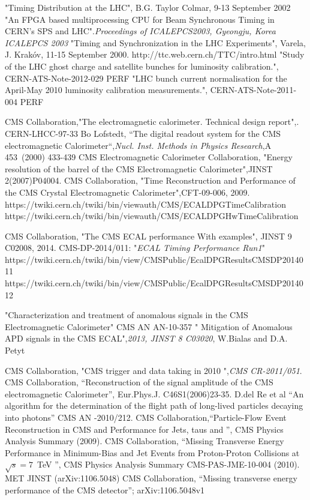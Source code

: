 \begin{thebibliography}{9}
 "Timing Distribution at the LHC",  B.G. Taylor Colmar, 9-13 September 2002
 "An FPGA based multiprocessing CPU for Beam
Synchronous Timing in CERN’s SPS and LHC".\emph{Proceedings of ICALEPCS2003, Gyeongju, Korea
ICALEPCS 2003}
 "Timing and Synchronization in the LHC Experiments", Varela, J. Krakóv, 11-15 September 2000.
 http://ttc.web.cern.ch/TTC/intro.html
 "Study of the LHC ghost charge and
satellite bunches for luminosity calibration.", CERN-ATS-Note-2012-029 PERF
 "LHC bunch current normalisation for the April-May 2010 luminosity calibration measurements.", CERN-ATS-Note-2011-004 PERF

CMS Collaboration,"The electromagnetic calorimeter. Technical design report",. CERN-LHCC-97-33
 Bo Lofstedt, ``The digital readout system for the CMS electromagnetic Calorimeter``,\textit{Nucl. Inst.  Methods in Physics Research},A 453~(2000) 433-439
CMS Electromagnetic Calorimeter Collaboration, "Energy resolution of the barrel of the CMS Electromagnetic Calorimeter",JINST 2(2007)P04004.
CMS Collaboration, "Time Reconstruction and Performance of the CMS Crystal Electromagnetic Calorimeter",CFT-09-006, 2009.
 https://twiki.cern.ch/twiki/bin/viewauth/CMS/ECALDPGTimeCalibration
https://twiki.cern.ch/twiki/bin/viewauth/CMS/ECALDPGHwTimeCalibration

CMS Collaboration, "The CMS ECAL performance With examples", JINST 9 C02008, 2014.
 CMS-DP-2014/011: "\textit{ECAL Timing Performance Run1}"
 https://twiki.cern.ch/twiki/bin/view/CMSPublic/EcalDPGResultsCMSDP2014011
https://twiki.cern.ch/twiki/bin/view/CMSPublic/EcalDPGResultsCMSDP2014012


 "Characterization and treatment of anomalous signals in the CMS Electromagnetic Calorimeter" CMS AN AN-10-357
 " Mitigation of Anomalous APD signals in the CMS ECAL",\textit{2013, JINST 8 C03020}, W.Bialas and D.A. Petyt

CMS Collaboration, "CMS trigger and data taking in 2010 ",\emph{CMS CR-2011/051}.
CMS Collaboration, ``Reconstruction of the signal amplitude of the CMS electromagnetic Calorimeter'', Eur.Phys.J. C46S1(2006)23-35.
 D.del Re et al ``An algorithm for the determination of the flight path of long-lived particles decaying into photons'' CMS AN -2010/212.
CMS Collaboration,``Particle-Flow Event Reconstruction in CMS and Performance for Jets, taus and \ETslash'', CMS Physics Analysis Summary (2009).
CMS Collaboration, “Missing Transverse Energy Performance in Minimum-Bias and Jet Events from Proton-Proton Collisions at $\sqrt{s} =7$~TeV ”, CMS Physics Analysis Summary CMS-PAS-JME-10-004 (2010).
MET JINST (arXiv:1106.5048)
CMS Collaboration, ``Missing transverse energy performance of the CMS detector''; arXiv:1106.5048v1


\end{thebibliography}
